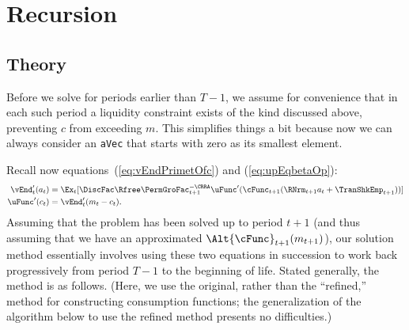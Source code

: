 \documentclass[titlepage, headings=optiontotocandhead]{\econtex}
\begin{document}
\hypertarget{Recursions}{}
\section{Recursion}\label{sec:recursion}
\hypertarget{Theory}{}
\subsection{Theory}
Before we solve for periods earlier than $T-1$, we assume for
convenience that in each such period a liquidity constraint exists of
the kind discussed above, preventing ${c}$ from exceeding ${m}$. This
simplifies things a bit because now we can always consider an
\texttt{aVec} that starts with zero as its smallest element.

Recall now equations~(\ref{eq:vEndPrimetOfc}) and (\ref{eq:upEqbetaOp}):
\begin{equation*}\begin{gathered}\begin{aligned}
      \vEnd_{t}^{\prime}({a}_{t})  & = \Ex_{t}[\DiscFac \Rfree \PermGroFac_{t+1}^{-\CRRA}
      \uFunc^{\prime}(\cFunc_{t+1}(\RNrm_{t+1} {a}_{t}+{\TranShkEmp}_{t+1}))]
      \\\uFunc^{\prime}({c}_{t})   & = \vEnd_{t}^{\prime}({m}_{t}-{c}_{t}).
    \end{aligned}\end{gathered}\end{equation*}
Assuming that the problem has been solved up to period $t+1$ (and thus
assuming that we have an approximated $\Alt{\cFunc}_{t+1}({m}_{t+1})$), our solution method essentially
involves using these two equations in succession to work back
progressively from period $T-1$ to the beginning of life.  Stated
generally, the method is as follows.  (Here, we use the original, rather than the ``refined,'' method for 
constructing consumption functions; the generalization of the algorithm below to use the refined method presents
no difficulties.)
\end{document}
